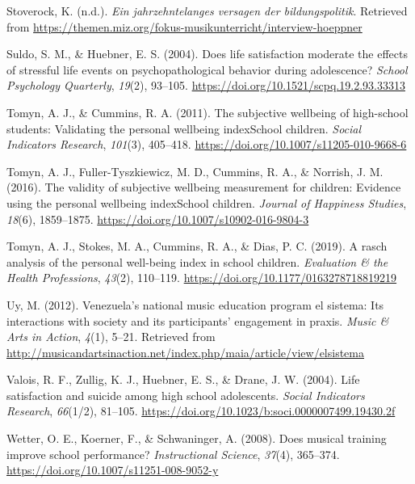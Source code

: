 \documentclass[a4, 12pt]{article}
\begin{document}
\leavevmode\hypertarget{ref-Stoverock}{}%
Stoverock, K. (n.d.). \emph{Ein jahrzehntelanges versagen der bildungspolitik}. Retrieved from \url{https://themen.miz.org/fokus-musikunterricht/interview-hoeppner}

\leavevmode\hypertarget{ref-Suldo2004}{}%
Suldo, S. M., \& Huebner, E. S. (2004). Does life satisfaction moderate the effects of stressful life events on psychopathological behavior during adolescence? \emph{School Psychology Quarterly}, \emph{19}(2), 93--105. \url{https://doi.org/10.1521/scpq.19.2.93.33313}

\leavevmode\hypertarget{ref-Tomyn2011a}{}%
Tomyn, A. J., \& Cummins, R. A. (2011). The subjective wellbeing of high-school students: Validating the personal wellbeing indexSchool children. \emph{Social Indicators Research}, \emph{101}(3), 405--418. \url{https://doi.org/10.1007/s11205-010-9668-6}

\leavevmode\hypertarget{ref-Tomyn2016}{}%
Tomyn, A. J., Fuller-Tyszkiewicz, M. D., Cummins, R. A., \& Norrish, J. M. (2016). The validity of subjective wellbeing measurement for children: Evidence using the personal wellbeing indexSchool children. \emph{Journal of Happiness Studies}, \emph{18}(6), 1859--1875. \url{https://doi.org/10.1007/s10902-016-9804-3}

\leavevmode\hypertarget{ref-Tomyn2019}{}%
Tomyn, A. J., Stokes, M. A., Cummins, R. A., \& Dias, P. C. (2019). A rasch analysis of the personal well-being index in school children. \emph{Evaluation \& the Health Professions}, \emph{43}(2), 110--119. \url{https://doi.org/10.1177/0163278718819219}

\leavevmode\hypertarget{ref-Uy2012}{}%
Uy, M. (2012). Venezuela's national music education program el sistema: Its interactions with society and its participants' engagement in praxis. \emph{Music \& Arts in Action}, \emph{4}(1), 5--21. Retrieved from \url{http://musicandartsinaction.net/index.php/maia/article/view/elsistema}

\leavevmode\hypertarget{ref-Valois2004}{}%
Valois, R. F., Zullig, K. J., Huebner, E. S., \& Drane, J. W. (2004). Life satisfaction and suicide among high school adolescents. \emph{Social Indicators Research}, \emph{66}(1/2), 81--105. \url{https://doi.org/10.1023/b:soci.0000007499.19430.2f}

\leavevmode\hypertarget{ref-Wetter2008}{}%
Wetter, O. E., Koerner, F., \& Schwaninger, A. (2008). Does musical training improve school performance? \emph{Instructional Science}, \emph{37}(4), 365--374. \url{https://doi.org/10.1007/s11251-008-9052-y}
\end{document}
